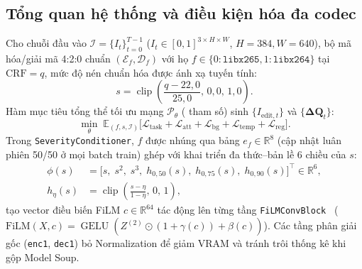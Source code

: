 \documentclass[journal]{IEEEtran}
\DeclareMathOperator{\clip}{clip}
\DeclareMathOperator{\GELU}{GELU}
\begin{document}
\subsection{Tổng quan hệ thống và điều kiện hóa đa codec}
Cho chuỗi đầu vào $\mathcal{I} = \{I_t\}_{t=0}^{T-1}$ ($I_t \in [0,1]^{3\times H\times W}$, $H=384, W=640$), bộ mã hóa/giải mã 4:2:0 chuẩn $(\mathcal{E}_f, \mathcal{D}_f)$ với họ $f \in \{0:\texttt{libx265}, 1:\texttt{libx264}\}$ tại $\mathrm{CRF}=q$, mức độ nén chuẩn hóa được ánh xạ tuyến tính:
\begin{equation}
    s = \clip\!\left(\frac{q - 22{,}0}{25{,}0},\, 0{,}0,\, 1{,}0\right).
    \label{eq:severity_map}
\end{equation}
Hàm mục tiêu tổng thể tối ưu mạng $\mathcal{P}_\theta$ (\tscopeTotalParams{} tham số) sinh $\{I_{\mathrm{edit},t}\}$ và $\{\mathbf{\Delta Q}_t\}$:
\begin{equation}
    \min_{\theta}\; \mathbb{E}_{(f, s, \mathcal{I})}\!\Big[ \mathcal{L}_{\mathrm{task}} + \mathcal{L}_{\mathrm{att}} + \mathcal{L}_{\mathrm{bg}} + \mathcal{L}_{\mathrm{temp}} + \mathcal{L}_{\mathrm{reg}} \Big].
    \label{eq:master_obj}
\end{equation}
Trong \texttt{SeverityConditioner}, $f$ được nhúng qua bảng $e_f \in \mathbb{R}^8$ (cập nhật luân phiên 50/50 ở mọi batch train) ghép với khai triển đa thức--bản lề 6 chiều của $s$:
\begin{align}
    \phi(s) &= \big[s,\; s^2,\; s^3,\; h_{0{,}50}(s),\; h_{0{,}75}(s),\; h_{0{,}90}(s)\big]^\top \in \mathbb{R}^6, \nonumber \\
    h_\eta(s) &= \clip\!\left(\frac{s - \eta}{1 - \eta},\, 0,\, 1\right),
    \label{eq:poly_hinge}
\end{align}
tạo vector điều biến FiLM $c \in \mathbb{R}^{64}$ tác động lên từng tầng \texttt{FiLMConvBlock}~\cite{perez2018film} ($\mathrm{FiLM}(X,c)=\GELU(Z^{(2)}\odot(1+\gamma(c))+\beta(c))$). Các tầng phân giải gốc (\texttt{enc1}, \texttt{dec1}) bỏ Normalization để giảm VRAM và tránh trôi thống kê khi gộp Model Soup.
\end{document}
